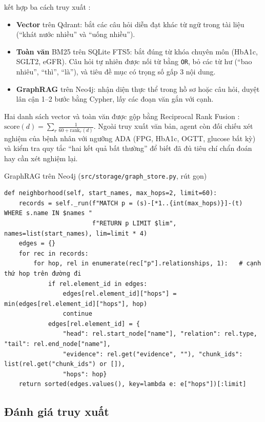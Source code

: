  kết hợp ba cách truy xuất \cite{lewis2020,gao2023rag}:
\begin{itemize}
  \item \textbf{Vector} trên Qdrant: bắt các câu hỏi diễn đạt khác từ ngữ trong tài liệu (``khát nước nhiều'' và ``uống nhiều'').
  \item \textbf{Toàn văn} BM25 \cite{robertson2009} trên SQLite FTS5: bắt đúng từ khóa chuyên môn (HbA1c, SGLT2, eGFR). Câu hỏi tự nhiên được nối từ bằng \texttt{OR}, bỏ các từ hư (``bao nhiêu'', ``thì'', ``là''), và tiêu đề mục có trọng số gấp 3 nội dung.
  \item \textbf{GraphRAG} \cite{edge2024graphrag} trên Neo4j: nhận diện thực thể trong hồ sơ hoặc câu hỏi, duyệt lân cận 1–2 bước bằng Cypher, lấy các đoạn văn gắn với cạnh.
\end{itemize}
Hai danh sách vector và toàn văn được gộp bằng Reciprocal Rank Fusion \cite{cormack2009}: $\mathrm{score}(d)=\sum_{r}\frac{1}{60+\mathrm{rank}_r(d)}$. Ngoài truy xuất văn bản, agent còn đối chiếu xét nghiệm của bệnh nhân với ngưỡng ADA (FPG, HbA1c, OGTT, glucose bất kỳ) và kiểm tra quy tắc ``hai kết quả bất thường'' để biết đã đủ tiêu chí chẩn đoán hay cần xét nghiệm lại.

\begin{code}{GraphRAG trên Neo4j (\texttt{src/storage/graph\_store.py}, rút gọn)}
\label{lst:neo4j}
\begin{verbatim}
def neighborhood(self, start_names, max_hops=2, limit=60):
    records = self._run(f"MATCH p = (s)-[*1..{int(max_hops)}]-(t) WHERE s.name IN $names "
                        f"RETURN p LIMIT $lim", names=list(start_names), lim=limit * 4)
    edges = {}
    for rec in records:
        for hop, rel in enumerate(rec["p"].relationships, 1):   # cạnh thứ hop trên đường đi
            if rel.element_id in edges:
                edges[rel.element_id]["hops"] = min(edges[rel.element_id]["hops"], hop)
                continue
            edges[rel.element_id] = {
                "head": rel.start_node["name"], "relation": rel.type, "tail": rel.end_node["name"],
                "evidence": rel.get("evidence", ""), "chunk_ids": list(rel.get("chunk_ids") or []),
                "hops": hop}
    return sorted(edges.values(), key=lambda e: e["hops"])[:limit]
\end{verbatim}
\end{code}

\subsection{Đánh giá truy xuất}

